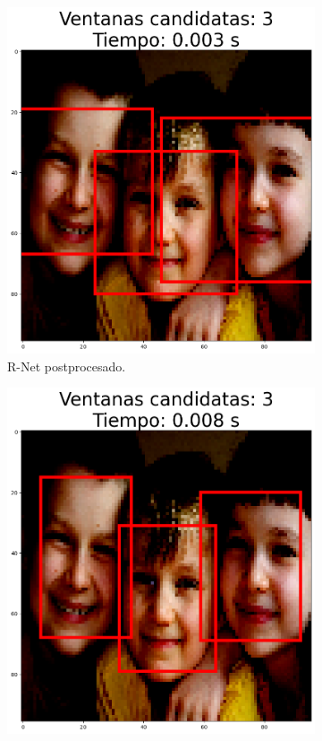 \begin{figure}[!htpb]
\begin{subfigure}[b]{0.28\textwidth}
         \includegraphics[width=\textwidth]{./Figures/test_tf_rnet_b.png}
         \caption{R-Net postprocesado.}
         \label{fig:2de3}
     \end{subfigure}
     \hfill
	 \begin{subfigure}[b]{0.28\textwidth}
         \centering
         \includegraphics[width=\textwidth]{./Figures/test_tf_onet_b.png}

\end{subfigure}
\end{figure}
